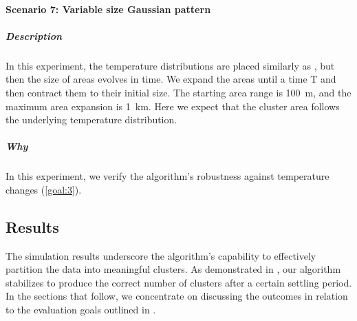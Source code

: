 \paragraph{Scenario 7: Variable size Gaussian pattern}
\subparagraph{Description}
In this experiment, the temperature distributions are placed similarly as ,
 but then the size of areas evolves in time.
 We expand the areas until a time T and then contract them to their initial size.
 The starting area range is \SI{100}{\metre}, and the maximum area expansion is \SI{1}{\kilo\metre}.
 Here we expect that the cluster area follows the underlying temperature distribution.
\subparagraph{Why} In this experiment, we verify the algorithm's robustness against temperature changes (\ref{goal:3}).
\subsection{Results}\label{s:eval:results}




The simulation results underscore the algorithm's capability to effectively partition the data into meaningful clusters. 
 As demonstrated in , 
 our algorithm stabilizes to produce the correct number of clusters after a certain settling period. 
In the sections that follow, we concentrate on discussing the outcomes in relation to the evaluation goals outlined in .
